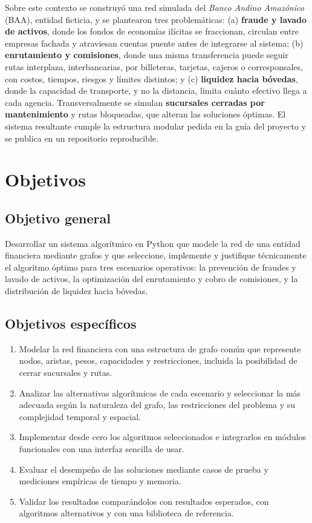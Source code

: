 \documentclass[11pt,a4paper]{article}
\begin{document}
Sobre este contexto se construyó una red simulada del \textit{Banco Andino Amazónico} (BAA), entidad ficticia, y se
plantearon tres problemáticas: (a) \textbf{fraude y lavado de activos}, donde los fondos de economías ilícitas se
fraccionan, circulan entre empresas fachada y atraviesan cuentas puente antes de integrarse al sistema; (b)
\textbf{enrutamiento y comisiones}, donde una misma transferencia puede seguir rutas interplaza, interbancarias,
por billeteras, tarjetas, cajeros o corresponsales, con costos, tiempos, riesgos y límites distintos; y (c)
\textbf{liquidez hacia bóvedas}, donde la capacidad de transporte, y no la distancia, limita cuánto efectivo llega
a cada agencia. Transversalmente se simulan \textbf{sucursales cerradas por mantenimiento} y rutas bloqueadas, que
alteran las soluciones óptimas. El sistema resultante cumple la estructura modular pedida en la guía del proyecto
\citep{rojas2026guia} y se publica en un repositorio reproducible.

\section{Objetivos}
\subsection{Objetivo general}
Desarrollar un sistema algorítmico en Python que modele la red de una entidad financiera mediante grafos y que
seleccione, implemente y justifique técnicamente el algoritmo óptimo para tres escenarios operativos: la prevención
de fraudes y lavado de activos, la optimización del enrutamiento y cobro de comisiones, y la distribución de
liquidez hacia bóvedas.

\subsection{Objetivos específicos}
\begin{enumerate}[label=OE\arabic*.,leftmargin=3.2em]
  \item Modelar la red financiera con una estructura de grafo común que represente nodos, aristas, pesos, capacidades
        y restricciones, incluida la posibilidad de cerrar sucursales y rutas.
  \item Analizar las alternativas algorítmicas de cada escenario y seleccionar la más adecuada según la naturaleza del
        grafo, las restricciones del problema y su complejidad temporal y espacial.
  \item Implementar desde cero los algoritmos seleccionados e integrarlos en módulos funcionales con una interfaz
        sencilla de usar.
  \item Evaluar el desempeño de las soluciones mediante casos de prueba y mediciones empíricas de tiempo y memoria.
  \item Validar los resultados comparándolos con resultados esperados, con algoritmos alternativos y con una
        biblioteca de referencia.
\end{enumerate}
\end{document}
